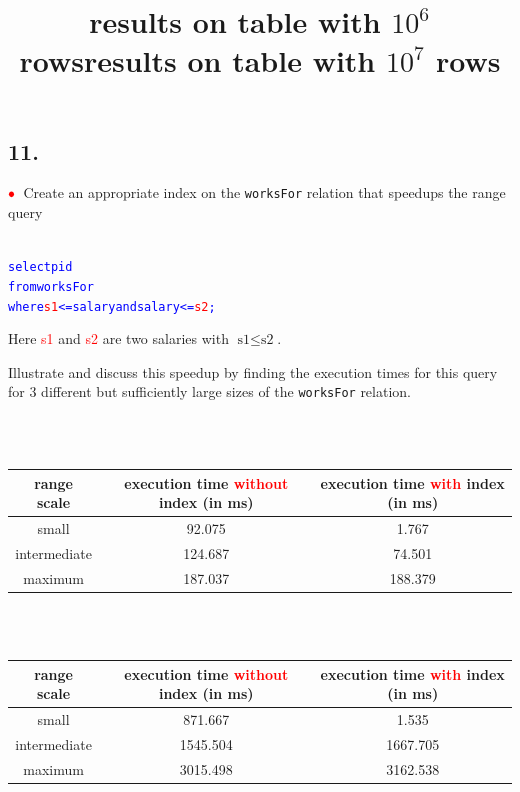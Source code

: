 \documentclass[10pt]{article}
\newcommand{\redbullet}{$\textcolor{red}{\bullet}$}
\begin{document}
\subsection*{11.}
\redbullet\  Create an appropriate index on the {\tt worksFor} relation that speedups the range query
\begin{alltt}\textcolor{blue}{
select pid
from   worksFor
where  \textcolor{red}{s1} <= salary and salary <= \textcolor{red}{s2};}
\end{alltt}
Here \textcolor{red}{s1} and \textcolor{red}{s2} are two salaries with $\text{s1} \leq \text{s2}$.

Illustrate and discuss this speedup by finding the execution times for this query for 3 different
but sufficiently large sizes of the {\tt worksFor} relation.

\begin{center}
\title{results on table with $10^6$ rows}
\\ \hspace*{\fill} \\
\begin{tabular}{c|c|c}
\hline
range scale & execution time \textcolor{red}{without} index (in ms) & execution time \textcolor{red}{with} index (in ms) \\ \hline
small & 92.075 & 1.767 \\
intermediate & 124.687 & 74.501 \\
maximum & 187.037 & 188.379 \\
\hline
\end{tabular}
\end{center}

\begin{center}
\title{results on table with $10^7$ rows}
\\ \hspace*{\fill} \\
\begin{tabular}{c|c|c}
\hline
range scale & execution time \textcolor{red}{without} index (in ms) & execution time \textcolor{red}{with} index (in ms) \\ \hline
small & 871.667 & 1.535 \\
intermediate & 1545.504 & 1667.705 \\
maximum & 3015.498 & 3162.538 \\
\hline
\end{tabular}
\end{center}
\end{document}

